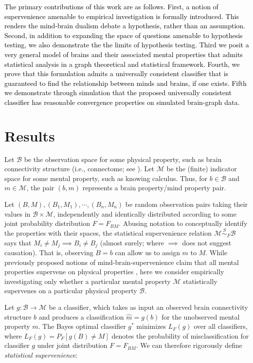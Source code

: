 \documentclass[10pt]{article}
\newcommand{\mB}{\mathcal{B}}
\newcommand{\mM}{\mathcal{M}}
\providecommand{\tr}[1]{\textcolor{black}{#1}}
\begin{document}
\tr{The primary contributions of this work are as follows.  First, a notion of supervenience amenable to empirical investigation is formally introduced.  This renders the mind-brain dualism debate a hypothesis, rather than an assumption.  Second, in addition to expanding the space of questions amenable to hypothesis testing, we also demonstrate the the limits of hypothesis testing.  Third we posit a very general model of brains and their associated mental properties that admits statistical analysis in a graph theoretical and statistical framework.  Fourth, we prove that this formulation admits a universally consistent classifier that is guaranteed to find the relationship between minds and brains, if one exists.  Fifth we demonstrate through simulation that the proposed universally consistent classifier has reasonable convergence properties on simulated brain-graph data.}

\section*{Results}

Let $\mB$ be the observation space for some physical property, such as brain connectivity structure (i.e., connectome; see \cite{SpornsKotter05,LichtmanSanes08,Seung09}). Let $\mM$ be the (finite) indicator space for some mental property, such as knowing calculus. Thus, for $b \in \mB$ and $m \in \mM$, the pair $(b,m)$ represents a brain property/mind property pair.

Let $(B,M), (B_1,M_1),\cdots,(B_n,M_n)$ be random observation pairs taking their values in $\mB \times \mM$, independently and identically distributed according to some joint probability distribution $F=F_{BM}$. Abusing notation to conceptually identify the properties with their spaces, the statistical supervenience relation $\mM \overset{S}{\sim}_F \mB$ says that $M_i \neq M_j \implies B_i \neq B_j$ (almost surely; where $\implies$ does not suggest causation). That is, observing $B=b$ can allow us to assign $m$ to $M$. While previously proposed notions of mind-brain-supervenience claim that all mental properties supervene on physical properties \cite{Kim95}, here we consider empirically investigating only whether a particular mental property $\mM$ statistically supervenes on a particular physical property $\mB$.

Let $g:\mB \rightarrow \mM$ be a classifier, which takes as input an observed brain connectivity structure $b$ and produces a classification $\widehat{m}=g(b)$ for the unobserved mental property $m$. The Bayes optimal classifier $g^*$ minimizes $L_{F}(g)$ over all classifiers, where $L_{F}(g) = P_{F}[g(B) \neq M]$ denotes the probability of misclassification for classifier $g$ under joint distribution $F=F_{BM}$. We can therefore rigorously define \textit{statistical supervenience}:
\end{document}
